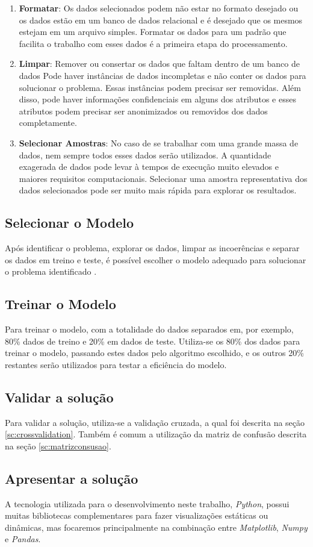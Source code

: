 \begin{enumerate}
	\item \textbf{Formatar}: Os dados selecionados podem não estar no formato desejado ou os dados estão em um banco de dados relacional e é desejado que os mesmos estejam em um arquivo simples. Formatar os dados para um padrão que facilita o trabalho com esses dados é a primeira etapa do processamento.
	\item \textbf{Limpar}: Remover ou consertar os dados que faltam dentro de um banco de dados  Pode haver instâncias de dados incompletas e não conter os dados para solucionar o problema. Essas instâncias podem precisar ser removidas. Além disso, pode haver informações confidenciais em alguns dos atributos e esses atributos podem precisar ser anonimizados ou removidos dos dados completamente.
	\item \textbf{Selecionar Amostras}: No caso de se trabalhar com uma grande massa de dados, nem sempre todos esses dados serão utilizados. A quantidade exagerada de dados pode levar à tempos de execução muito elevados e maiores requisitos computacionais. Selecionar uma amostra representativa dos dados selecionados pode ser muito mais rápida para explorar os resultados.
\end{enumerate}

\subsection{Selecionar o Modelo}
Após identificar o problema, explorar os dados, limpar as incoerências e separar os dados em treino e teste, é possível escolher o modelo adequado para solucionar o problema identificado \cite{geron2017hands}.

\subsection{Treinar o Modelo}
Para treinar o modelo, com a totalidade do dados separados em, por exemplo, 80\% dados de treino e 20\% em dados de teste. Utiliza-se os 80\% dos dados para treinar o modelo, passando estes dados pelo algoritmo escolhido, e os outros 20\% restantes serão utilizados para testar a eficiência do modelo.

\subsection{Validar a solução}
Para validar a solução, utiliza-se a validação cruzada, a qual foi descrita na seção \ref{sc:crossvalidation}. Também é comum a utilização da matriz de confusão descrita na seção \ref{sc:matrizconsusao}.

\subsection{Apresentar a solução}
A tecnologia utilizada para o desenvolvimento neste trabalho, \textit{Python}, possui muitas bibliotecas complementares para fazer visualizações estáticas ou dinâmicas, mas focaremos principalmente na combinação entre \textit{Matplotlib}, \textit{Numpy} e \textit{Pandas}.
